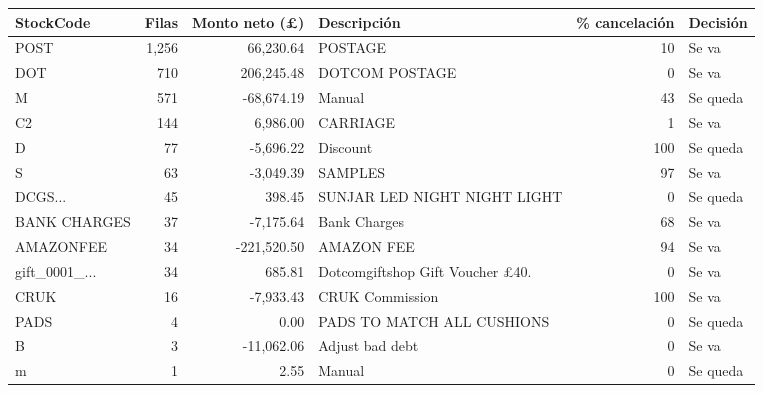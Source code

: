 \begin{tabular}{lrrlrl}
\toprule
StockCode & Filas & Monto neto (\pounds) & Descripción & \% cancelación & Decisión \\
\midrule
POST & 1,256 & 66,230.64 & POSTAGE & 10 & Se va \\
DOT & 710 & 206,245.48 & DOTCOM POSTAGE & 0 & Se va \\
M & 571 & -68,674.19 & Manual & 43 & Se queda \\
C2 & 144 & 6,986.00 & CARRIAGE & 1 & Se va \\
D & 77 & -5,696.22 & Discount & 100 & Se queda \\
S & 63 & -3,049.39 & SAMPLES & 97 & Se va \\
DCGS... & 45 & 398.45 & SUNJAR LED NIGHT NIGHT LIGHT & 0 & Se queda \\
BANK CHARGES & 37 & -7,175.64 & Bank Charges & 68 & Se va \\
AMAZONFEE & 34 & -221,520.50 & AMAZON FEE & 94 & Se va \\
gift\_0001\_... & 34 & 685.81 & Dotcomgiftshop Gift Voucher \pounds{}40. & 0 & Se va \\
CRUK & 16 & -7,933.43 & CRUK Commission & 100 & Se va \\
PADS & 4 & 0.00 & PADS TO MATCH ALL CUSHIONS & 0 & Se queda \\
B & 3 & -11,062.06 & Adjust bad debt & 0 & Se va \\
m & 1 & 2.55 & Manual & 0 & Se queda \\
\bottomrule
\end{tabular}

